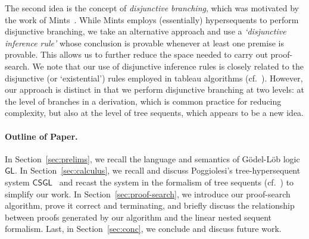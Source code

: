 \documentclass[copyright,creativecommons]{eptcs}
\newcommand{\logicgl}{\mathsf{GL}}
\newcommand{\calc}{\mathsf{CSGL}}
\begin{document}

The second idea is the concept of \emph{disjunctive branching}, which was motivated by the work of Mints~\cite{Min00}. While Mints employs (essentially) hypersequents to perform disjunctive branching, we take an
alternative approach and use a \emph{`disjunctive inference rule'} whose conclusion is provable whenever at least one premise is provable. This allows us to further reduce the space needed to carry out proof-search. We note that our use of disjunctive inference rules is closely related
to the disjunctive (or `existential') rules employed in tableau
algorithms (cf.~\cite{AbaGor09}). However, our approach is distinct in that we perform disjunctive branching at two levels: at the level of branches in a derivation, which is common practice for reducing complexity, but also at the level of tree sequents, which appears to be a new idea.






\paragraph{Outline of Paper.} In Section~\ref{sec:prelims}, we recall the language and semantics of Gödel-Löb logic $\logicgl$. In Section~\ref{sec:calculus}, we recall and discuss Poggiolesi's tree-hypersequent system $\calc$~\cite{Pog09b} and recast the system in the formalism of tree sequents (cf.~\cite{GorRam12,IshKik07}) to simplify our work. In Section~\ref{sec:proof-search}, we introduce our proof-search algorithm, prove it correct and terminating, and briefly discuss the relationship between proofs generated by our algorithm and the linear nested sequent formalism. Last, in Section~\ref{sec:conc}, we conclude and discuss future work. 
\end{document}
